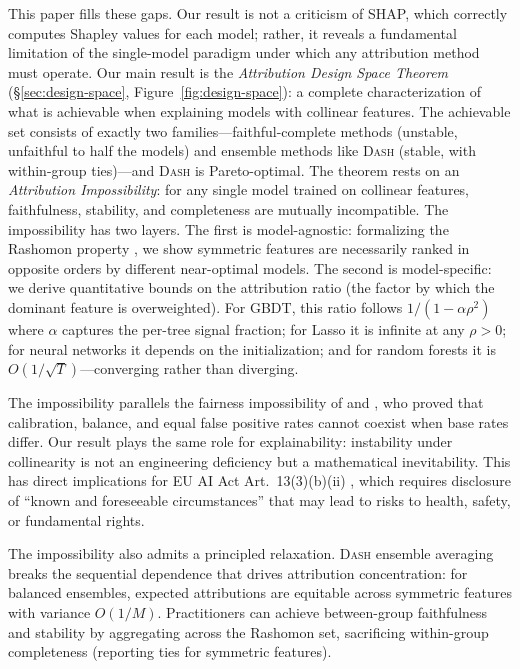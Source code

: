 \documentclass{article}
\newcommand{\DASH}{\textsc{Dash}}
\newcommand{\GBDT}{\textsc{GBDT}}
\begin{document}
\begin{sloppypar}
This paper fills these gaps. Our result is not a criticism of SHAP, which correctly computes Shapley values for each model; rather, it reveals a fundamental limitation of the single-model paradigm under which any attribution method must operate.
Our main result is the \emph{Attribution Design Space Theorem}
(\S\ref{sec:design-space}, Figure~\ref{fig:design-space}): a complete
characterization of what is achievable when explaining models with collinear features.
The achievable set consists of exactly two families---faithful-complete methods
(unstable, unfaithful to half the models) and ensemble methods like \DASH{} (stable,
with within-group ties)---and \DASH{} is Pareto-optimal.
The theorem rests on an \emph{Attribution Impossibility}: for any single model trained
on collinear features, faithfulness, stability, and completeness are mutually
incompatible.
The impossibility has two layers.
The first is model-agnostic: formalizing the Rashomon property
\citep{rudin2024amazing}, we show symmetric features are necessarily ranked in
opposite orders by different near-optimal models.
The second is model-specific: we derive quantitative bounds on the attribution ratio
(the factor by which the dominant feature is overweighted).
For \GBDT{}, this ratio follows $1/(1-\alpha\rho^2)$ where $\alpha$ captures the
per-tree signal fraction; for Lasso it is infinite at any $\rho > 0$; for neural
networks it depends on the initialization; and for random forests it is
$O(1/\sqrt{T})$---converging rather than diverging.
\end{sloppypar}

\begin{sloppypar}
The impossibility parallels the fairness impossibility of \citep{chouldechova2017fair} and \citep{kleinberg2017inherent}, who proved that calibration, balance, and equal false positive rates cannot coexist when base rates differ. Our result plays the same role for explainability: instability under collinearity is not an engineering deficiency but a mathematical inevitability. This has direct implications for EU AI Act Art.~13(3)(b)(ii) \citep{euaiact2024}, which requires disclosure of ``known and foreseeable circumstances'' that may lead to risks to health, safety, or fundamental rights.
\end{sloppypar}

The impossibility also admits a principled relaxation.
\DASH{} ensemble averaging breaks the sequential dependence that drives attribution concentration: for balanced ensembles, expected attributions are equitable across symmetric features with variance $O(1/M)$.
Practitioners can achieve between-group faithfulness and stability by aggregating across the Rashomon set, sacrificing within-group completeness (reporting ties for symmetric features).
\end{document}
